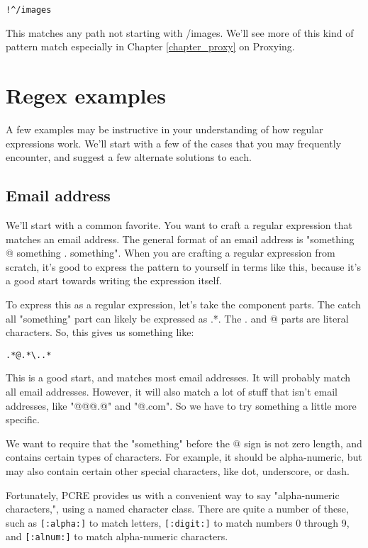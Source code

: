 \verb=!^/images=

This matches any path not starting with /images. We'll see more of this kind of pattern 
match especially in Chapter \ref{chapter_proxy} on Proxying.

\section{Regex examples}

A few examples may be instructive in your understanding of how regular expressions 
work. We'll start with a few of the cases that you may frequently encounter, and suggest a 
few alternate solutions to each.

\subsection{Email address}

We'll start with a common favorite. You want to craft a regular expression that matches 
an email address. The general format of an email address is "something @ something . 
something". When you are crafting a regular expression from scratch, it's good to express the 
pattern to yourself in terms like this, because it's a good start towards writing the expression 
itself.

To express this as a regular expression, let's take the component parts. The catch all 
"something" part can likely be expressed as .*. The . and @ parts are literal characters.
So, this gives us something like:

\verb=.*@.*\..*=

This is a good start, and matches most email addresses. It will probably match all email 
addresses. However, it will also match a lot of stuff that isn't email addresses, like 
"@@@.@" and "@.com". So we have to try something a little more specific.

We want to require that the "something" before the @ sign is not zero length, and 
contains certain types of characters. For example, it should be alpha-numeric, but may also 
contain certain other special characters, like dot, underscore, or dash.

Fortunately, PCRE provides us with a convenient way to say "alpha-numeric 
characters,", using a named character class. There are quite a number of these, such as 
\verb=[:alpha:]= to match letters, \verb=[:digit:]= to match numbers 0 through 9, and \verb=[:alnum:]= to match 
alpha-numeric characters.

